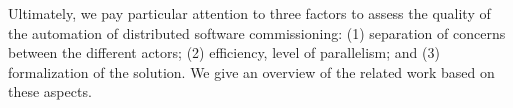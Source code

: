 
Ultimately, we pay particular attention to three factors to
assess the quality of the automation of distributed software
commissioning: (1) separation of concerns between the different
actors; (2) efficiency, \ie level of parallelism; and (3)
formalization of the solution. We give an overview of the related work
based on these aspects.
